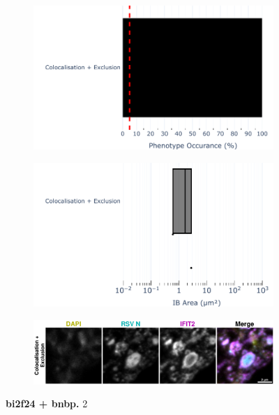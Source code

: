 \begin{figure}
    \begin{subfigure}{0.495\textwidth}
        \caption{}
        \includegraphics[width=1\linewidth]{10. Chapter 5/Figs/04. IFIT2-RNA binding mutant/02. pIB/04. bar_bi2f24_bnbp.pdf} 
    \end{subfigure}
    \begin{subfigure}{0.495\textwidth}
        \caption{}
        \includegraphics[width=1\linewidth]{10. Chapter 5/Figs/04. IFIT2-RNA binding mutant/02. pIB/05. box_bi2f24_bnbp.pdf}
    \end{subfigure}
    \begin{subfigure}{1\textwidth}
        \centering
        \caption{}
        \includegraphics[width=1\linewidth]{10. Chapter 5/Figs/04. IFIT2-RNA binding mutant/02. pIB/06. bi2f24-bnbp.pdf}
    \end{subfigure}
    \caption[bi2f24 + bnbp]{\textbf{bi2f24 + bnbp.} 2}
    \label{fig:bi2f24 + bnbp}
\end{figure}

